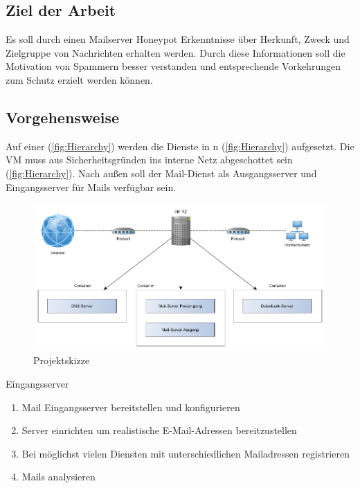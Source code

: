 \documentclass[a4paper,11pt,singlespacing]{article}
\begin{document}
	\subsection{Ziel der Arbeit}\label{sec:EinleitungZiel}
		Es soll durch einen Mailserver Honeypot Erkenntnisse über Herkunft, Zweck und Zielgruppe von  Nachrichten erhalten werden.
		Durch diese Informationen soll die Motivation von Spammern besser verstanden und entsprechende Vorkehrungen zum Schutz erzielt werden können.
	
	\subsection{Vorgehensweise}\label{sec:EinleitungVorgehensweise}
		Auf einer  (\autoref{fig:Hierarchy}) werden die Dienste in n (\autoref{fig:Hierarchy}) aufgesetzt.
		Die VM muss aus Sicherheitsgründen ins interne Netz abgeschottet sein (\autoref{fig:Hierarchy}).
		Nach außen soll der Mail-Dienst als Ausgangsserver und Eingangsserver für Mails verfügbar sein.

		\begin{figure}[H]
		\includegraphics[width=\linewidth]{2-Hierarchy.png}
		\caption{Projektskizze}
		\label{fig:Hierarchy}
		\end{figure}

		Eingangsserver
		\begin{enumerate}
		\item Mail Eingangsserver bereitstellen und konfigurieren
		\item {} Server einrichten um realistische E-Mail-Adressen bereitzustellen
		\item Bei möglichst vielen Diensten mit unterschiedlichen Mailadressen registrieren
		\item Mails analysieren
		\end{enumerate}
\end{document}
